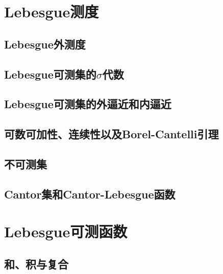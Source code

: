 \documentclass[lang=cn,newtx,10pt,scheme=chinese]{elegantbook}
\begin{document}
\chapter{Lebesgue测度}

\section{Lebesgue外测度}







\section{Lebesgue可测集的$\sigma $代数}





\section{Lebesgue可测集的外逼近和内逼近}





\section{可数可加性、连续性以及Borel-Cantelli引理}




\section{不可测集}





\section{Cantor集和Cantor-Lebesgue函数}







\chapter{Lebesgue可测函数}

\section{和、积与复合}
\end{document}
